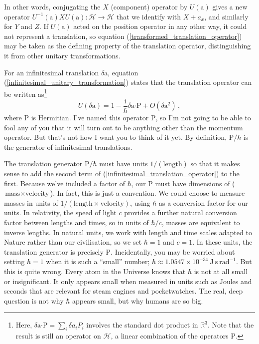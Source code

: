 \documentclass{article}
\theoremstyle{plain}\theoremheaderfont{\normalfont\itshape}\theorembodyfont{\rmfamily}\theoremseparator{.}\newtheorem*{rem}{Remark}\newtheorem*{ex}{Example}\newtheorem*{proof}{Proof}\newtheorem*{altp}{Alternative proof}
\theoremstyle{plain}\theoremheaderfont{\normalfont\bfseries}\theorembodyfont{\rmfamily}\theoremseparator{.}\newtheorem{thm}{Theorem}[section]\newtheorem{lem}[thm]{Lemma}\newtheorem{prop}[thm]{Proposition}\newtheorem*{cor}{Corollary}\newtheorem{defn}[thm]{Definition}\newtheorem{clm}[thm]{Claim}\newtheorem{clminproof}{Claim}
\theoremstyle{break}\theoremheaderfont{\normalfont\itshape}\theorembodyfont{\rmfamily}\theoremseparator{.\medskip}\newtheorem*{proofskip}{Proof}\newtheorem*{exs}{Examples}\newtheorem*{rems}{Remarks}
\theoremstyle{break}\theoremheaderfont{\normalfont\bfseries}\theorembodyfont{\rmfamily}\theoremseparator{.\medskip}\newtheorem{lemskip}[thm]{Lemma}\newtheorem{defnskip}[thm]{Definition}\newtheorem{propskip}[thm]{Proposition}\newtheorem{thmskip}[thm]{Theorem}
\numberwithin{equation}{section}
\newcommand{\unit}[1]{\ \mathrm{#1}}
\newcommand{\ii}{\mathrm{i}}
\newcommand{\vb}[1]{\bm{\mathrm{#1}}}
\newcommand{\vdot}{\bm{\cdot}}
\newcommand{\hb}{\mathcal{H}}
\newcommand{\RR}{\mathbb{R}}
\begin{document}
    In other words, conjugating the \(X\) (component) operator by \(U(\vb{a})\) gives a new operator \(U^{-1}(\vb{a})XU(\vb{a}):\hb\to\hb\) that we identify with \(X+a_x\), and similarly for \(Y\) and \(Z\). If \(U(\vb{a})\) acted on the position operator in any other way, it could not represent a translation, so equation (\ref{transformed_translation_operator}) may be taken as the defining property of the translation operator, distinguishing it from other unitary transformations.

    For an infinitesimal translation \(\delta\vb{a}\), equation (\ref{infinitesimal_unitary_transformation}) states that the translation operator can be written as\footnote{Here, \(\delta\vb{a}\vdot\vb{P}=\sum_i\delta a_iP_i\) involves the standard dot product in \(\RR^3\). Note that the result is still an operator on \(\hb\), a linear combination of the operators \(\vb{P}\).}
    \begin{equation}\label{infinitesimal_translation_operator}
        U(\delta\vb{a})=1-\frac{\ii}{\hbar}\delta\vb{a}\vdot\vb{P}+O(\delta\vb{a}^2)\,,
    \end{equation}
    where \(\vb{P}\) is Hermitian. I've named this operator \(\vb{P}\), so I'm not going to be able to fool any of you that it will turn out to be anything other than the momentum operator. But that's not how I want you to think of it yet. By definition, \(\vb{P}/\hbar\) is the generator of infinitesimal
    translations.

    The translation generator \(\vb{P}/\hbar\) must have units \(1/(\text{length})\) so that it makes sense to add the second term of (\ref{infinitesimal_translation_operator}) to the first. Because we've included a factor of \(\hbar\), our \(\vb{P}\) must have dimensions of (\(\text{mass}\times\text{velocity}\)). In fact, this is just a convention. We could choose to measure masses in units of \(1/(\text{length}\times\text{velocity})\), using \(\hbar\) as a conversion factor for our units. In relativity, the speed of light \(c\) provides a further natural conversion factor between lengths and times, so in units of \(\hbar/c\), masses are equivalent to inverse lengths. In natural units, we work with length and time scales adapted to Nature rather than our civilisation, so we set \(\hbar=1\) and \(c=1\). In these units, the translation generator is precisely \(\vb{P}\). Incidentally, you may be worried about setting \(\hbar=1\) when it is such a ``small'' number; \(\hbar\approx 1.0547\times 10^{-34}\unit{J}\unit{s}\unit{rad}^{-1}\). But this is quite wrong. Every atom in the Universe knows that \(\hbar\) is not at all small or insignificant. It only appears small when measured in units such as Joules and seconds that are relevant for steam engines and pocketwatches. The real, deep question is not why \(\hbar\) appears small, but why humans are so big.
\end{document}
